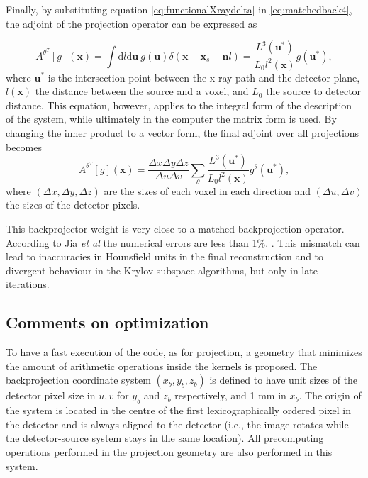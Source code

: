 Finally, by substituting equation \ref{eq:functionalXraydelta} in \ref{eq:matchedback4}, the adjoint of the projection operator can be expressed as

\begin{equation}
A^{\theta^T}[g](\textbf{x})=\int\mathrm{d}l\mathrm{d}\textbf{u} \ g(\textbf{u})\delta(\textbf{x}-\textbf{x}_s-\textbf{n}l)=\frac{L^3(\textbf{u}^*)}{L_0l^2(\textbf{x})}g(\textbf{u}^*),
\end{equation}
where $\textbf{u}^*$ is the intersection point between the x-ray path and the detector plane, $l(\textbf{x})$ the distance between the source and a voxel, and $L_0$ the source to detector distance. This equation, however, applies to the integral form of the description of the system, while ultimately in the computer the matrix form is used. By changing the inner product to a vector form, the final adjoint over all projections becomes
\begin{equation}
A^{\theta^T}[g](\textbf{x})=\frac{\Delta x \Delta y \Delta z}{\Delta u \Delta v}\sum_\theta\frac{L^3(\textbf{u}^*)}{L_0l^2(\textbf{x})}g^\theta(\textbf{u}^*),\label{eq:finalmatched}
\end{equation}
where $(\Delta x,\Delta y,\Delta z)$ are the sizes of each voxel in each direction and $(\Delta u,\Delta v)$ the sizes of the detector pixels. 

This backprojector weight is very close to a matched backprojection operator. According to Jia \textit{et al} the numerical errors are less than 1\%. . This mismatch can lead to inaccuracies in Hounsfield units in the final reconstruction and to divergent behaviour in the Krylov subspace algorithms, but only in late iterations.

\subsection{Comments on optimization}

To have a fast execution of the code, as for projection, a geometry that minimizes the amount of arithmetic operations inside the kernels is proposed. The backprojection coordinate system $(x_b,y_b,z_b)$ is defined to have unit sizes of the detector pixel size in $u,v$ for $y_b$ and $z_b$ respectively, and 1 mm in $x_b$. The origin of the system is located in the centre of the first lexicographically ordered pixel in the detector and is always aligned to the detector (i.e., the image rotates while the detector-source system stays in the same location).  All precomputing operations performed in the projection geometry are also performed in this system.

